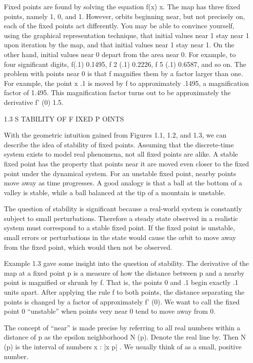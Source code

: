 \documentclass[12pt]{article}
\begin{document}
Fixed points are found by solving the equation f(x)  x. The map has three fixed points, namely 1, 0, and 1. 
However, orbits beginning near, but not precisely on, each of the fixed points act differently. You may be 
able to convince yourself, using the graphical representation technique, that initial values near 1 stay 
near 1 upon iteration by the map, and that initial values near 1 stay near 1. On the other hand, initial 
values near 0 depart from the area near 0. For example, to four significant digits, f(.1)  0.1495, f 2 (.1)  
0.2226, f 5 (.1)  0.6587, and so on. The problem with points near 0 is that f magnifies them by a factor 
larger than one. For example, the point x  .1 is moved by f to approximately .1495, a magnification factor 
of 1.495. This magnification factor turns out to be approximately the derivative f' (0)  1.5.

1.3 S TABILITY OF F IXED P OINTS

With the geometric intuition gained from Figures 1.1, 1.2, and 1.3, we can describe the idea of stability 
of fixed points. Assuming that the discrete-time system exists to model real phenomena, not all fixed 
points are alike. A stable fixed point has the property that points near it are moved even closer to the 
fixed point under the dynamical system. For an unstable fixed point, nearby points move away as time 
progresses. A good analogy is that a ball at the bottom of a valley is stable, while a ball balanced at the 
tip of a mountain is unstable.

The question of stability is significant because a real-world system is constantly subject to small 
perturbations. Therefore a steady state observed in a realistic system must correspond to a stable fixed 
point. If the fixed point is unstable, small errors or perturbations in the state would cause the orbit to 
move away from the fixed point, which would then not be observed.

Example 1.3 gave some insight into the question of stability. The derivative of the map at a fixed point p 
is a measure of how the distance between p and a nearby point is magnified or shrunk by f. That is, the 
points 0 and .1 begin exactly .1 units apart. After applying the rule f to both points, the distance 
separating the points is changed by a factor of approximately f' (0). We want to call the fixed point 0 
“unstable” when points very near 0 tend to move away from 0.

The concept of “near” is made precise by referring to all real numbers within a distance  of p as the 
epsilon neighborhood N  (p). Denote the real line by. Then N  (p) is the interval of numbers x  : |x  p|     
. We usually think of  as a small, positive number.
\end{document}
